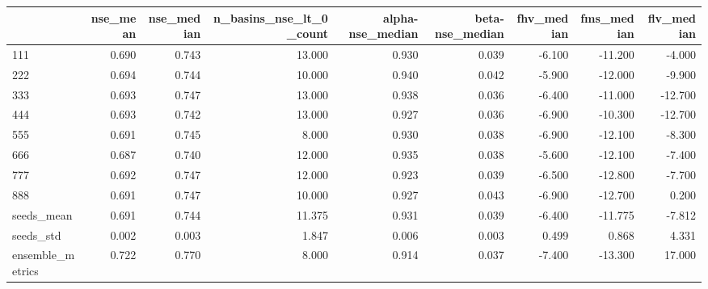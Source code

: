 \begin{tabular}{lrrrrrrrr}
\toprule
 & nse_mean & nse_median & n_basins_nse_lt_0_count & alpha-nse_median & beta-nse_median & fhv_median & fms_median & flv_median \\
\midrule
111 & 0.690 & 0.743 & 13.000 & 0.930 & 0.039 & -6.100 & -11.200 & -4.000 \\
222 & 0.694 & 0.744 & 10.000 & 0.940 & 0.042 & -5.900 & -12.000 & -9.900 \\
333 & 0.693 & 0.747 & 13.000 & 0.938 & 0.036 & -6.400 & -11.000 & -12.700 \\
444 & 0.693 & 0.742 & 13.000 & 0.927 & 0.036 & -6.900 & -10.300 & -12.700 \\
555 & 0.691 & 0.745 & 8.000 & 0.930 & 0.038 & -6.900 & -12.100 & -8.300 \\
666 & 0.687 & 0.740 & 12.000 & 0.935 & 0.038 & -5.600 & -12.100 & -7.400 \\
777 & 0.692 & 0.747 & 12.000 & 0.923 & 0.039 & -6.500 & -12.800 & -7.700 \\
888 & 0.691 & 0.747 & 10.000 & 0.927 & 0.043 & -6.900 & -12.700 & 0.200 \\
seeds_mean & 0.691 & 0.744 & 11.375 & 0.931 & 0.039 & -6.400 & -11.775 & -7.812 \\
seeds_std & 0.002 & 0.003 & 1.847 & 0.006 & 0.003 & 0.499 & 0.868 & 4.331 \\
ensemble_metrics & 0.722 & 0.770 & 8.000 & 0.914 & 0.037 & -7.400 & -13.300 & 17.000 \\
\bottomrule
\end{tabular}
